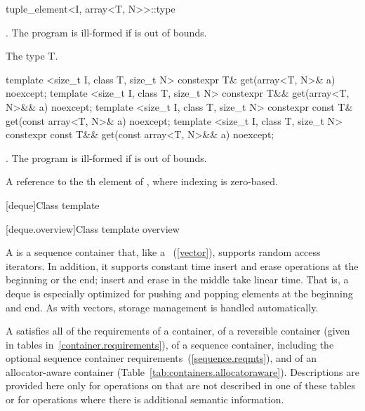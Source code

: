 %
\begin{itemdecl}
tuple_element<I, array<T, N>>::type
\end{itemdecl}

\begin{itemdescr}
\pnum
\requires {}. The program is ill-formed if  is out of bounds.

\pnum
\cvalue  The type T.
\end{itemdescr}

%
%
\begin{itemdecl}
template <size_t I, class T, size_t N>
  constexpr T& get(array<T, N>& a) noexcept;
template <size_t I, class T, size_t N>
  constexpr T&& get(array<T, N>&& a) noexcept;
template <size_t I, class T, size_t N>
  constexpr const T& get(const array<T, N>& a) noexcept;
template <size_t I, class T, size_t N>
  constexpr const T&& get(const array<T, N>&& a) noexcept;
\end{itemdecl}

\begin{itemdescr}
\pnum
\requires {}. The program is ill-formed if  is out of bounds.

\pnum
\returns A reference to the th element of ,
where indexing is zero-based.
\end{itemdescr}

[deque]{Class template }

[deque.overview]{Class template  overview}

\pnum
A
%
is a sequence container that, like a
~(\ref{vector}), supports random access iterators.
In addition, it supports constant time insert and erase operations at the beginning or the end;
insert and erase in the middle take linear time.
That is, a deque is especially optimized for pushing and popping elements at the beginning and end.
As with vectors, storage management is handled automatically.

\pnum
A
satisfies all of the requirements of a container, of a reversible container
(given in tables in~\ref{container.requirements}), of a sequence container,
including the optional sequence container requirements~(\ref{sequence.reqmts}), and of an allocator-aware container (Table~\ref{tab:containers.allocatoraware}).
Descriptions are provided here only for operations on
that are not described in one of these tables
or for operations where there is additional semantic information.

